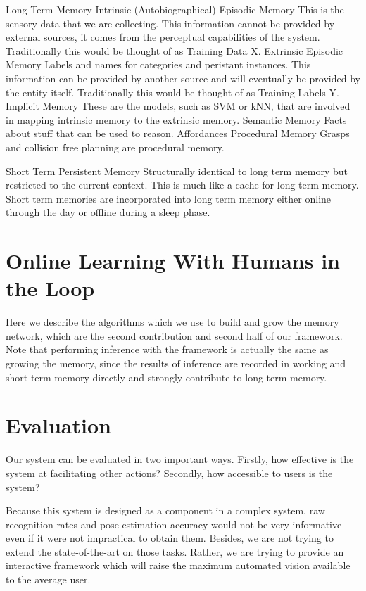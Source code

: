 \documentclass[12pt]{article}
\numberwithin{equation}{section}
\numberwithin{table}{section}
\numberwithin{figure}{section}
\begin{document}
Long Term Memory
  Intrinsic (Autobiographical) Episodic Memory
    This is the sensory data that we are collecting.
    This information cannot be provided by external
    sources, it comes from the perceptual capabilities of the system.
    Traditionally this would be thought of as Training Data X.
  Extrinsic Episodic Memory
    Labels and names for categories and peristant instances.
    This information can be provided by another source and will
    eventually be provided by the entity itself.
    Traditionally this would be thought of as Training Labels Y.
  Implicit Memory
    These are the models, such as SVM or kNN, that are involved in
    mapping intrinsic memory to the extrinsic memory.
  Semantic Memory
    Facts about stuff that can be used to reason. Affordances
  Procedural Memory
    Grasps and collision free planning are procedural memory.

Short Term Persistent Memory
  Structurally identical to long term memory but restricted to the current context.
  This is much like a cache for long term memory. Short term memories are incorporated 
  into long term memory either online through the day or offline during a sleep phase.
    


\section{Online Learning With Humans in the Loop}
Here we describe the algorithms which we use to build and grow the memory network,
which are the second contribution and second half of our framework.
Note that performing inference with the framework is actually the same as growing the
memory, since the results of inference are recorded in working and short term memory
directly and strongly contribute to long term memory.



\section{Evaluation}
Our system can be evaluated in two important ways. Firstly, how effective is 
the system at facilitating other actions? Secondly, how accessible to users is the system?

Because this system is designed as a component in a complex system, raw recognition rates
and pose estimation accuracy would not be very informative even if it were not impractical to
obtain them.  Besides, we are not trying to extend the state-of-the-art on those tasks. Rather,
we are trying to provide an interactive framework which will raise the maximum automated vision
available to the average user.
\end{document}
